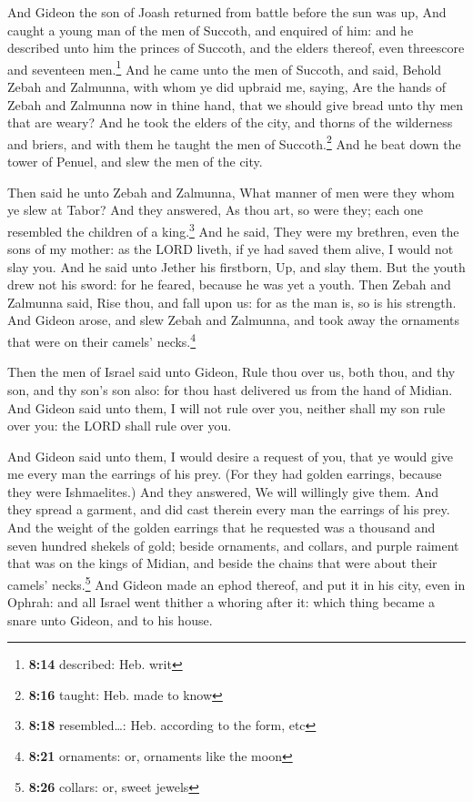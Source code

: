  And Gideon the son of Joash returned from battle before
the sun was up,  And caught a young man of the men of
Succoth, and enquired of him: and he described unto him the princes of
Succoth, and the elders thereof, even threescore and seventeen
men.\footnote{\textbf{8:14} described: Heb. writ}  And he
came unto the men of Succoth, and said, Behold Zebah and Zalmunna, with
whom ye did upbraid me, saying, Are the hands of Zebah and Zalmunna now
in thine hand, that we should give bread unto thy men that are weary?
 And he took the elders of the city, and thorns of the
wilderness and briers, and with them he taught the men of
Succoth.\footnote{\textbf{8:16} taught: Heb. made to know}
 And he beat down the tower of Penuel, and slew the men
of the city.

 Then said he unto Zebah and Zalmunna, What manner of men
were they whom ye slew at Tabor? And they answered, As thou art, so were
they; each one resembled the children of a king.\footnote{\textbf{8:18}
  resembled\ldots: Heb. according to the form, etc}  And
he said, They were my brethren, even the sons of my mother: as the LORD
liveth, if ye had saved them alive, I would not slay you.
 And he said unto Jether his firstborn, Up, and slay
them. But the youth drew not his sword: for he feared, because he was
yet a youth.  Then Zebah and Zalmunna said, Rise thou,
and fall upon us: for as the man is, so is his strength. And Gideon
arose, and slew Zebah and Zalmunna, and took away the ornaments that
were on their camels' necks.\footnote{\textbf{8:21} ornaments: or,
  ornaments like the moon}

 Then the men of Israel said unto Gideon, Rule thou over
us, both thou, and thy son, and thy son's son also: for thou hast
delivered us from the hand of Midian.  And Gideon said
unto them, I will not rule over you, neither shall my son rule over you:
the LORD shall rule over you.

 And Gideon said unto them, I would desire a request of
you, that ye would give me every man the earrings of his prey. (For they
had golden earrings, because they were Ishmaelites.)  And
they answered, We will willingly give them. And they spread a garment,
and did cast therein every man the earrings of his prey. 
And the weight of the golden earrings that he requested was a thousand
and seven hundred shekels of gold; beside ornaments, and collars, and
purple raiment that was on the kings of Midian, and beside the chains
that were about their camels' necks.\footnote{\textbf{8:26} collars: or,
  sweet jewels}  And Gideon made an ephod thereof, and
put it in his city, even in Ophrah: and all Israel went thither a
whoring after it: which thing became a snare unto Gideon, and to his
house.

